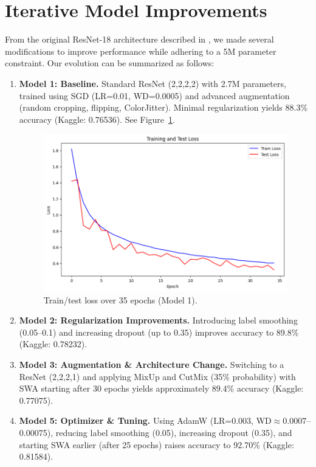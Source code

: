 \documentclass[letterpaper]{article}
\begin{document}
\section{Iterative Model Improvements}

From the original ResNet-18 architecture described in \cite{he2015deep}, we made several modifications to improve performance while adhering to a 5M parameter constraint. Our evolution can be summarized as follows:

\begin{enumerate}
    \item \textbf{Model 1: Baseline.} Standard ResNet (2,2,2,2) with 2.7M parameters, trained using SGD (LR=0.01, WD=0.0005) and advanced augmentation (random cropping, flipping, ColorJitter). Minimal regularization yields 88.3\% accuracy (Kaggle: 0.76536). See Figure~\ref{fig:training_performance_8825}.
    
    \begin{figure}[ht]
    \centering
         \includegraphics[width=0.7\linewidth]{traintest_lost-88.25.png}
    \caption{Train/test loss over 35 epochs (Model 1).}
    \label{fig:training_performance_8825}
    \end{figure}

    \item \textbf{Model 2: Regularization Improvements.} Introducing label smoothing (0.05--0.1) and increasing dropout (up to 0.35) improves accuracy to 89.8\% (Kaggle: 0.78232).

    \item \textbf{Model 3: Augmentation \& Architecture Change.} Switching to a ResNet (2,2,2,1) and applying MixUp and CutMix (35\% probability) with SWA starting after 30 epochs yields approximately 89.4\% accuracy (Kaggle: 0.77075).

    \item \textbf{Model 5: Optimizer \& Tuning.} Using AdamW (LR=0.003, WD$\approx$0.0007–0.00075), reducing label smoothing (0.05), increasing dropout (0.35), and starting SWA earlier (after 25 epochs) raises accuracy to 92.70\% (Kaggle: 0.81584).


\end{enumerate}
\end{document}
